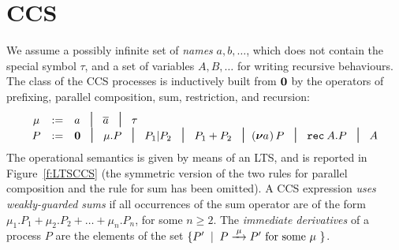 
\section{CCS}
\label{ss:ccs}


We assume  a possibly infinite set of \emph{names} $a, b,
\ldots$, which does not contain the special symbol $\tau$, and
a set of variables $A,B, \ldots$ for writing recursive behaviours. 
The class  of the CCS processes is inductively built from ${\boldsymbol 0}$ by the operators
of  prefixing, parallel composition,  sum,
 restriction,  and recursion:
\begin{equation*}
\begin{array}{ccl}
\mu  & := &  a \; \midd \;  \outC a  \; \midd \;  \tau \\
P  & := &  \nil \; \midd \;  \mu . P \; \midd \;  P_1 |  P_2 \; \midd  \;
P_1 + P_2 \; \midd %
  (\res a\!)\, P  \;  \midd \;   \recu A  P\;  \midd \; A   %
\end{array}
\end{equation*}
The operational semantics is given by means of an LTS, and is
reported in Figure~\ref{f:LTSCCS} (the symmetric version  of the two rules for
parallel composition and the rule for sum  has been omitted).
A CCS expression \emph{uses weakly-guarded sums} if all occurrences of
the sum  operator are of the form $\mu_1.P_1 + \mu_2.P_2 + \ldots
+ \mu_n.P_n$, for some $n \geq 2$. 
 The \emph{immediate derivatives} of a
process $P$ are the elements of  the set $\{P' \st P \arr\mu P' \mbox{ for some $\mu$ }
\}$.   
